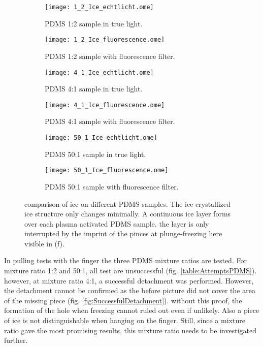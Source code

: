 \begin{figure}[hbt!]
	\centering
	\begin{subfigure}[]{0.45\textwidth}
		\centering
		\texttt{[image: 1\_2\_Ice\_echtlicht.ome]}
		\caption{PDMS 1:2 sample in true light.}
	\end{subfigure}
	\begin{subfigure}[]{0.45\textwidth}
		\centering
		\texttt{[image: 1\_2\_Ice\_fluorescence.ome]}
		\caption{PDMS 1:2 sample with fluorescence filter.}
	\end{subfigure}
	\begin{subfigure}[]{0.45\textwidth}
		\centering
		\texttt{[image: 4\_1\_Ice\_echtlicht.ome]}
		\caption{PDMS 4:1 sample in true light.}
	\end{subfigure}
	\begin{subfigure}[]{0.45\textwidth}
		\centering
		\texttt{[image: 4\_1\_Ice\_fluorescence.ome]}
		\caption{PDMS 4:1 sample with fluorescence filter.}
	\end{subfigure}
	\begin{subfigure}[]{0.45\textwidth}
		\centering
		\texttt{[image: 50\_1\_Ice\_echtlicht.ome]}
		\caption{PDMS 50:1 sample in true light.}
	\end{subfigure}
	\begin{subfigure}[]{0.45\textwidth}
		\centering
		\texttt{[image: 50\_1\_Ice\_fluorescence.ome]}
		\caption{PDMS 50:1 sample with fluorescence filter.}
		\label{fig:VglPDMSicemixtureratio_f}
	\end{subfigure}
	\caption{comparison of ice on different PDMS samples. The ice crystallized ice structure only changes minimally. A continuous ice layer forms over each plasma activated PDMS sample. the layer is only interrupted by the imprint of the pinces at plunge-freezing here visible in (f).}
	\label{fig:VglPDMSicemixtureratio}
\end{figure}

In pulling tests with the finger the three PDMS mixture ratios are tested. For mixture ratio 1:2 and 50:1, all test are unsuccessful (fig. \ref{table:AttemptsPDMS}). however, at mixture ratio 4:1, a successful detachment was performed. However, the detachment cannot be confirmed as the before picture did not cover the area of the missing piece (fig. \ref{fig:SuccessfulDetachment}). without this proof, the formation of the hole when freezing cannot ruled out even if unlikely. Also a piece of ice is not distinguishable when hanging on the finger. Still, since a mixture ratio gave the most promising results, this mixture ratio needs to be investigated further.

